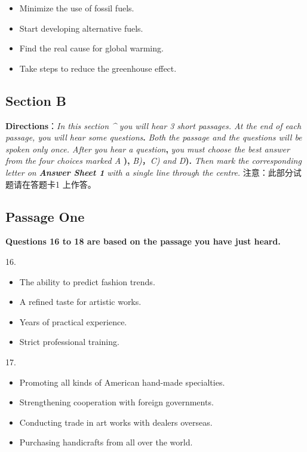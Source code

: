 \documentclass[UTF8,11pt]{ctexart}
\begin{document}
\begin{itemize}[leftmargin=2em,itemsep=.2em,topsep=.4em]\item[A.] Minimize the use of fossil fuels.
\item[B.] Start developing alternative fuels.
\item[C.] Find the real cause for global warming.
\item[D.] Take steps to reduce the greenhouse effect.
\end{itemize}

\subsection*{\textbf{Section B}}


\textbf{Directions}：\textit{In this section \textasciicircum{} you will hear 3 short passages. At the end of each passage, you will hear some questions}\textbf{.}\textit{ Both} \textit{the passage and the questions will be spoken only once. After you hear a question}\textbf{,}\textit{ you must choose the best answer from} \textit{the four choices marked A}\textbf{ ),}\textit{ B)}，\textit{C) and D}\textbf{).}\textit{ Then mark the corresponding letter on}\textbf{\textit{ Answer Sheet 1}}\textit{ with a single line} \textit{through the centre.} 注意：此部分试题请在答题卡1 上作答。


\subsection*{\textbf{Passage One}}


\textbf{Questions 16 to 18 are based on the passage you have just heard.}


16.


\begin{itemize}[leftmargin=2em,itemsep=.2em,topsep=.4em]\item[A.] The ability to predict fashion trends.
\item[B.] A refined taste for artistic works.
\item[C.] Years of practical experience.
\item[D.] Strict professional training.
\end{itemize}

17.


\begin{itemize}[leftmargin=2em,itemsep=.2em,topsep=.4em]\item[A.] Promoting all kinds of American hand-made specialties.
\item[B.] Strengthening cooperation with foreign governments.
\item[C.] Conducting trade in art works with dealers overseas.
\item[D.] Purchasing handicrafts from all over the world.
\end{itemize}
\end{document}
